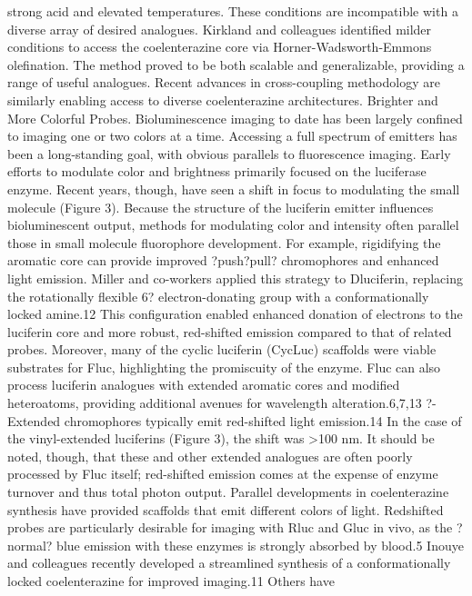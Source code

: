 strong acid and elevated temperatures. These conditions are
incompatible with a diverse array of desired analogues. Kirkland
and colleagues identified milder conditions to access the
coelenterazine core via Horner-Wadsworth-Emmons olefination.\cite{Shakhmin:2016bd}
The method proved to be both scalable and generalizable,
providing a range of useful analogues. Recent advances
in cross-coupling methodology are similarly enabling access to
diverse coelenterazine architectures.\cite{Hosoya:2015iu}
Brighter and More Colorful Probes. Bioluminescence
imaging to date has been largely confined to imaging one or
two colors at a time. Accessing a full spectrum of emitters has
been a long-standing goal, with obvious parallels to
fluorescence imaging. Early efforts to modulate color and
brightness primarily focused on the luciferase enzyme.\cite{RN26} Recent
years, though, have seen a shift in focus to modulating the small
molecule (Figure 3).
Because the structure of the luciferin emitter influences
bioluminescent output, methods for modulating color and
intensity often parallel those in small molecule fluorophore
development. For example, rigidifying the aromatic core can
provide improved ?push?pull? chromophores and enhanced
light emission. Miller and co-workers applied this strategy to Dluciferin,
replacing the rotationally flexible 6? electron-donating
group with a conformationally locked amine.12 This configuration
enabled enhanced donation of electrons to the luciferin
core and more robust, red-shifted emission compared to that of
related probes. Moreover, many of the cyclic luciferin (CycLuc)
scaffolds were viable substrates for Fluc, highlighting the
promiscuity of the enzyme.
Fluc can also process luciferin analogues with extended
aromatic cores and modified heteroatoms, providing additional
avenues for wavelength alteration.6,7,13 ?-Extended chromophores
typically emit red-shifted light emission.14 In the case of
the vinyl-extended luciferins (Figure 3), the shift was >100 nm.
It should be noted, though, that these and other extended
analogues are often poorly processed by Fluc itself; red-shifted
emission comes at the expense of enzyme turnover and thus
total photon output.
Parallel developments in coelenterazine synthesis have
provided scaffolds that emit different colors of light. Redshifted
probes are particularly desirable for imaging with Rluc
and Gluc in vivo, as the ?normal? blue emission with these
enzymes is strongly absorbed by blood.5 Inouye and colleagues
recently developed a streamlined synthesis of a conformationally
locked coelenterazine for improved imaging.11 Others have
